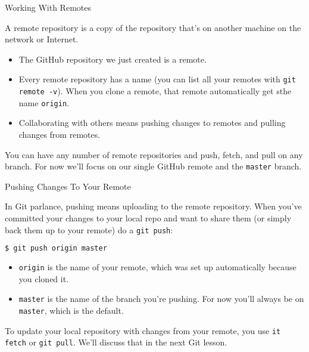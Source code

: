 \documentclass{beamer}
\begin{document}
\begin{frame}[fragile]{Working With Remotes}


A remote repository is a copy of the repository that's on another machine on the network or Internet.
\begin{itemize}
\item The GitHub repository we just created is a remote.
\item Every remote repository has a name (you can list all your remotes with {\tt git remote -v}).  When you clone a remote, that remote automatically get sthe name {\tt origin}.
\item Collaborating with others means pushing changes to remotes and pulling changes from remotes.
\end{itemize}
You can have any number of remote repositories and push, fetch, and pull on any branch.  For now we'll focus on our single GitHub remote and the {\tt master} branch.

\end{frame}

\begin{frame}[fragile]{Pushing Changes To Your Remote}


In Git parlance, pushing means uploading to the remote repository.  When you've committed your changes to your local repo and want to share them (or simply back them up to your remote) do a {\tt git push}:
\begin{lstlisting}[language=bash]
$ git push origin master
\end{lstlisting}

\begin{itemize}
\item {\tt origin} is the name of your remote, which was set up automatically because you cloned it.
\item {\tt master} is the name of the branch you're pushing.  For now you'll always be on {\tt master}, which is the default.
\end{itemize}

To update your local repository with changes from your remote, you use {\tt it fetch} or {\tt git pull}.  We'll discuss that in the next Git lesson.

\end{frame}
\end{document}
